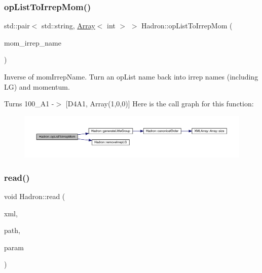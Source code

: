 \subsubsection{\texorpdfstring{opListToIrrepMom()}{opListToIrrepMom()}}
{\footnotesize\ttfamily std\+::pair$<$ std\+::string, \mbox{\hyperlink{classXMLArray_1_1Array}{Array}}$<$ int $>$ $>$ Hadron\+::op\+List\+To\+Irrep\+Mom (\begin{DoxyParamCaption}\item[{const std\+::string \&}]{mom\+\_\+irrep\+\_\+name }\end{DoxyParamCaption})}



Inverse of mom\+Irrep\+Name. Turn an op\+List name back into irrep names (including LG) and momentum. 

Turns 100\+\_\+\+A1 -\/$>$ \mbox{[}D4\+A1, Array(1,0,0)\mbox{]} Here is the call graph for this function\+:\nopagebreak
\begin{figure}[H]
\begin{center}
\leavevmode
\includegraphics[width=350pt]{d1/daf/namespaceHadron_a8bd515c92e3dbbe8e9741b25d71edc60_cgraph}
\end{center}
\end{figure}
\mbox{\label{namespaceHadron_ae9e95e7c9b97a878e77c48ea5619a53a}} 
\subsubsection{\texorpdfstring{read()}{read()}\hspace{0.1cm}{\footnotesize\ttfamily [1/94]}}
{\footnotesize\ttfamily void Hadron\+::read (\begin{DoxyParamCaption}\item[{\mbox{\hyperlink{classADATXML_1_1XMLReader}{X\+M\+L\+Reader}} \&}]{xml,  }\item[{const std\+::string \&}]{path,  }\item[{\mbox{\hyperlink{structHadron_1_1HadronNptType__t}{Hadron\+Npt\+Type\+\_\+t}} \&}]{param }\end{DoxyParamCaption})}

